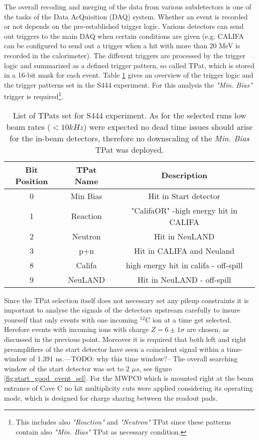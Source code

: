 \begin{enumerate}
The overall recoding and merging of the data from various subdetectors is one of the tasks of the Data AcQuisition (DAQ) system. Whether an event is recorded or not depends on the pre-established trigger logic. Various detectors can send out triggers to the main DAQ when certain conditions are given (e.g. CALIFA can be configured to send out a trigger when a hit with more than 20 MeV is recorded in the calorimeter). The different triggers are processed by the trigger logic and summarized as a defined trigger pattern, so called TPat, which is stored in a 16-bit mask for each event. Table \ref{tab:tpats} gives an overview of the trigger logic and the trigger patterns set in the S444 experiment. For this analysis the \textit{"Min. Bias"} trigger is required\footnote{This includes also \textit{"Reaction"} and \textit{"Neutron"} TPat since these patterns contain also \textit{"Min. Bias"} TPat as necessary condition.}.\newline 
\begin{table}[h!]
\centering
\begin{tabular}{||c c c||} 
\hline
Bit Position &TPat Name & Description \\
\hline\hline
0 & Min Bias & Hit in Start detector\\
1 & Reaction & "CalifaOR" -high energy hit in CALIFA \\
2 & Neutron & Hit in NeuLAND \\
3 & p+n & Hit in CALIFA and Neuland \\
8 & Califa & high energy hit in califa - off-spill \\
9 & NeuLAND & Hit in NeuLAND - off-spill \\
\hline\hline
\end{tabular}
\caption{List of TPats set for S444 experiment. As for the selected runs low beam rates ($< 10kHz$) were expected no dead time issues should arise for the in-beam detectors, therefore no downscaling of the \textit{Min. Bias} TPat was deployed.}
\label{tab:tpats}
\end{table}
Since the TPat selection itself does not necessary set any pileup constraints it is important to analyse the signals of the detectors upstream carefully to insure yourself that only events with  one incoming $^{12}$C ion at a time get selected. Herefore events with incoming ions with charge $Z = 6 \pm 1\sigma$ are chosen, as discussed in the previous point. Moreover it is required that both left and right preamplifiers of the start detector have seen a coincident signal within a time-window of 1.391 ns.---TODO: why this time window?-- The overall searching window of the start detector was set to 2 $\mu s$, see figure \ref{fig:start_good_event_sel}. For the MWPC0 which is mounted right at the beam entrance of Cave C no hit multiplicity cuts were applied considering its operating mode, which is designed for charge sharing between the readout pads. 

\end{enumerate}

